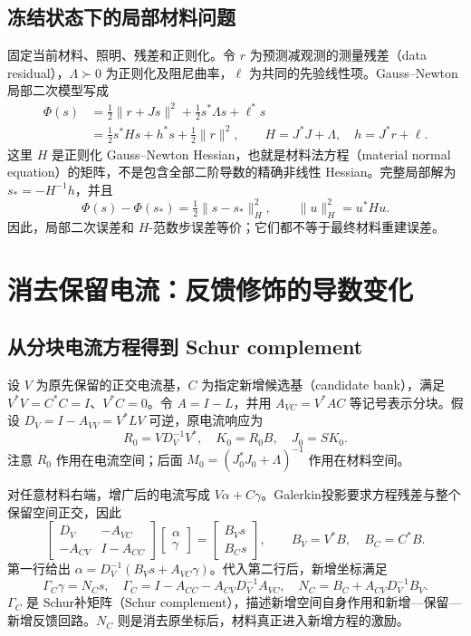 \subsection{冻结状态下的局部材料问题}
固定当前材料、照明、残差和正则化。令 $r$ 为预测减观测的测量残差（data residual），$\Lambda\succ0$ 为正则化及阻尼曲率，$\ell$ 为共同的先验线性项。Gauss--Newton局部二次模型写成
\begin{equation}
 \begin{aligned}
 \Phi(s)&=\tfrac12\|r+Js\|^2
             +\tfrac12s^*\Lambda s+\ell^*s\\
 &=\tfrac12s^*Hs+h^*s+\tfrac12\|r\|^2,\qquad
 H=J^*J+\Lambda,\quad h=J^*r+\ell.
 \end{aligned}
\end{equation}
这里 $H$ 是正则化 Gauss--Newton Hessian，也就是材料法方程（material normal equation）的矩阵，不是包含全部二阶导数的精确非线性 Hessian。完整局部解为 $s_*=-H^{-1}h$，并且
\begin{equation}
 \Phi(s)-\Phi(s_*)=\tfrac12\|s-s_*\|_H^2,
 \qquad \|u\|_H^2=u^*Hu.
\end{equation}
因此，局部二次误差和 $H$-范数步误差等价；它们都不等于最终材料重建误差。

\section{消去保留电流：反馈修饰的导数变化}
\subsection{从分块电流方程得到 Schur complement}
设 $V$ 为原先保留的正交电流基，$C$ 为指定新增候选基（candidate bank），满足 $V^*V=C^*C=I$、$V^*C=0$。令 $A=I-L$，并用 $A_{VC}=V^*AC$ 等记号表示分块。假设 $D_V=I-A_{VV}=V^*LV$ 可逆，原电流响应为
\begin{equation}
 R_0=VD_V^{-1}V^*,\quad K_0=R_0B,\quad J_0=SK_0.
\end{equation}
注意 $R_0$ 作用在电流空间；后面 $M_0=(J_0^*J_0+\Lambda)^{-1}$ 作用在材料空间。

对任意材料右端，增广后的电流写成 $V\alpha+C\gamma$。Galerkin投影要求方程残差与整个保留空间正交，因此
\begin{equation}
 \begin{bmatrix}D_V&-A_{VC}\\-A_{CV}&I-A_{CC}\end{bmatrix}
 \begin{bmatrix}\alpha\\\gamma\end{bmatrix}
 =\begin{bmatrix}B_Vs\\B_Cs\end{bmatrix},
 \qquad B_V=V^*B,\quad B_C=C^*B.
\end{equation}
第一行给出 $\alpha=D_V^{-1}(B_Vs+A_{VC}\gamma)$。代入第二行后，新增坐标满足
\begin{equation}
 \Gamma_C\gamma=N_Cs,
 \quad\Gamma_C=I-A_{CC}-A_{CV}D_V^{-1}A_{VC},
 \quad N_C=B_C+A_{CV}D_V^{-1}B_V.
\end{equation}
$\Gamma_C$ 是 Schur补矩阵（Schur complement），描述新增空间自身作用和新增—保留—新增反馈回路。$N_C$ 则是消去原坐标后，材料真正进入新增方程的激励。


